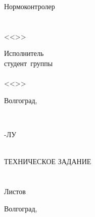 {{\begin{flushleft}
\begin{minipage}[c]{15em}
Нормоконтролер\\
\VSTUStandardsAdviserDegree\\
\makebox[2cm]{\hrulefill}\VSTUStandardsAdviserName\\
<<\makebox[1.5cm]{\hrulefill}>>\makebox[3.5cm]{\hrulefill}\the\year
\end{minipage}
\hspace{\fill}
\begin{minipage}[c]{15em}
Исполнитель\\
студент~группы~\VSTUStudentGroup\\
\makebox[2cm]{\hrulefill}\VSTUStudentName\\
<<\makebox[1.5cm]{\hrulefill}>>\makebox[3.5cm]{\hrulefill}\the\year
\end{minipage}
\end{flushleft}
\vspace{\fill}
\begin{center}
Волгоград,~\the\year
\end{center}
\newpage
\clearpage
\thispagestyle{empty}
\setcounter{page}{1}
\\
\par{\small \VSTULUCode-ЛУ\\}
\vspace{\fill}
\begin{center}
\VSTUTitle\\
\vspace{8mm}
ТЕХНИЧЕСКОЕ ЗАДАНИЕ\\
\VSTUDocumentCode{}\\
\VSTULUCode\\
Листов \totalpages\\
\end{center}
\vspace{\fill}
\begin{center}
Волгоград,~\the\year
\end{center}
\newpage
}
}
